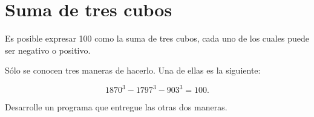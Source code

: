\section{Suma de tres cubos}

Es posible expresar 100 como la suma de tres cubos, cada uno de los
cuales puede ser negativo o positivo.

Sólo se conocen tres maneras de hacerlo. Una de ellas es la siguiente:

\[1870^{3} - 1797^{3} - 903^{3} = 100.\]

Desarrolle un programa que entregue las otras dos maneras.

